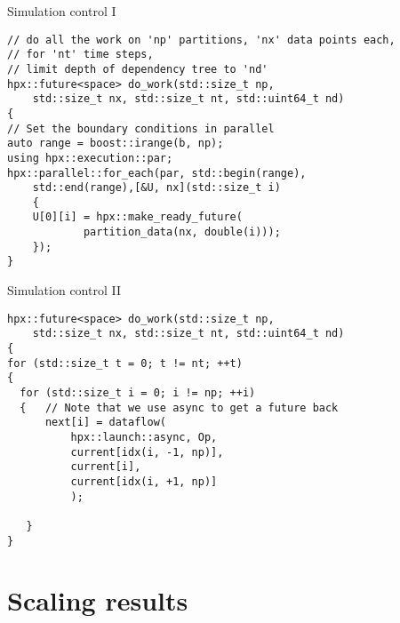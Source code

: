 \documentclass[\classoption]{beamer}
\begin{document}
\begin{frame}[fragile]{Simulation control I}

\begin{lstlisting}
// do all the work on 'np' partitions, 'nx' data points each, 
// for 'nt' time steps, 
// limit depth of dependency tree to 'nd'
hpx::future<space> do_work(std::size_t np, 
    std::size_t nx, std::size_t nt, std::uint64_t nd)
{
// Set the boundary conditions in parallel
auto range = boost::irange(b, np);
using hpx::execution::par;
hpx::parallel::for_each(par, std::begin(range), 
    std::end(range),[&U, nx](std::size_t i)
    {
    U[0][i] = hpx::make_ready_future(
    	    partition_data(nx, double(i)));
    });  
}
\end{lstlisting}

\end{frame}

\begin{frame}[fragile]{Simulation control II}

\begin{lstlisting}
hpx::future<space> do_work(std::size_t np, 
    std::size_t nx, std::size_t nt, std::uint64_t nd)
{
for (std::size_t t = 0; t != nt; ++t)
{
  for (std::size_t i = 0; i != np; ++i)
  {   // Note that we use async to get a future back
      next[i] = dataflow(
          hpx::launch::async, Op,
          current[idx(i, -1, np)], 
          current[i], 
          current[idx(i, +1, np)]
          );

   }
}
\end{lstlisting}

\end{frame}


\section{Scaling results}
\end{document}
